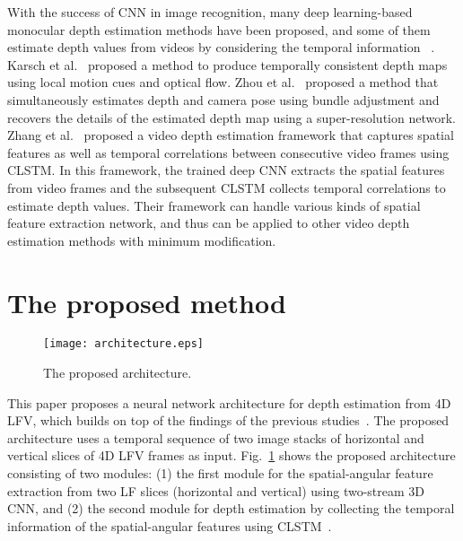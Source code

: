 \documentclass[]{spie}
\newcommand{\jtextd}[1]{}
\begin{document}
With the success of CNN in image recognition, 
many deep learning-based monocular depth estimation methods have been proposed, 
and some of them estimate depth values from videos by considering 
the temporal information
~\cite{karsch2014depth,zhou2018unsupervised,zhang2019exploiting}.
Karsch et al.~\cite{karsch2014depth} proposed a method
to produce temporally consistent depth maps
using local motion cues and optical flow. 
Zhou et al.~\cite{zhou2018unsupervised} proposed a method that
simultaneously estimates depth and camera pose using bundle adjustment
and recovers the details of the estimated depth map using a
super-resolution network.
Zhang et al.~\cite{zhang2019exploiting} proposed a video depth
estimation framework that captures spatial features as well as
temporal correlations between consecutive video frames using CLSTM.
In this framework, the trained deep CNN extracts the spatial features
from video frames and the subsequent CLSTM collects temporal
correlations to estimate depth values.
Their framework can handle various kinds
of spatial feature extraction network, and thus can be applied to
other video depth estimation methods with minimum modification.



\section{The proposed method}

\begin{figure}[tbp]
  \centering
  \texttt{[image: architecture.eps]}
  \caption{The proposed architecture.}
  \label{fig:architecture}
\end{figure}

\jtextd{
   本研究では，これまでの研究
   ~\cite{zhang2016robust,leistner2019learning,faluvegi20193d}
の知見に基づき，各4D LFVフレームの2つの角度方向スライス（水平，垂直）のシーケンスを
   入力として使用する奥行き推定ニューラルネットワークアーキテクチャを提案する．
図\ref{fig:architecture}に示すように，提案アーキテクチャは，
   (1) 2ストリーム3D CNNを用いた2つの角度方向スライスからの空間-角度特徴抽出部と，
   (2) CLSTMを用いた時系列方向の集約による奥行きマップの推定部との2つのモジュールから構成される．
}

This paper proposes a neural network architecture for depth estimation
from 4D LFV, which builds on top of the findings of the previous
studies~\cite{zhang2016robust,faluvegi20193d}.
The proposed architecture uses a temporal sequence of two
image stacks of horizontal and vertical slices of 4D LFV frames as input.
Fig.~\ref{fig:architecture} shows the proposed architecture consisting
of two modules:
(1) the first module for the spatial-angular feature extraction from two
LF slices (horizontal and vertical) 
using two-stream 3D CNN, and
(2) the second module for depth estimation 
by collecting the temporal information
of the spatial-angular features
using CLSTM~\cite{zhang2019exploiting}.
\end{document}

